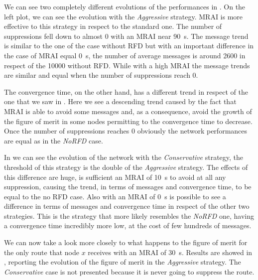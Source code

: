 We can see two completely different evolutions of the performances in .
On the left plot, we can see the evolution with the \textit{Aggressive} strategy.
\ac{MRAI} is more effective to this strategy in respect to the standard one.
The number of suppressions fell down to almost \num{0} with an \ac{MRAI} near
\SI{90}{\second}.
The message trend is similar to the one of the case without \ac{RFD} but with an
important difference in the case of  \ac{MRAI} equal \SI{0}{\second}, the number
of average messages is around \num{2600} in respect of the \num{10000} without
\ac{RFD}.
While with a high \ac{MRAI} the message trends are similar and equal when the number of
suppressions reach \num{0}.

The convergence time, on the other hand, has a different trend in respect of
the one that we saw in .
Here we see a descending trend caused by the fact that \ac{MRAI} is able to avoid
some messages and, as a consequence, avoid the growth of the figure of merit in
some nodes permitting to the convergence time to decrease.
Once the number of suppressions reaches \num{0} obviously the network performances
are equal as in the \textit{NoRFD} case.

In  we can see the evolution of the network with the
\textit{Conservative} strategy, the threshold of this strategy is the double of
the \textit{Aggressive} strategy.
The effects of this difference are huge, is sufficient an \ac{MRAI} of \SI{10}{\second}
to avoid at all any suppression, causing the trend, in terms of messages and
convergence time, to be equal to the no \ac{RFD} case.
Also with an \ac{MRAI} of \SI{0}{\second} is possible to see a difference in
terms of messages and convergence time in respect of the other two strategies.
This is the strategy that more likely resembles the \textit{NoRFD} one,
having a convergence time incredibly more low, at the cost of few hundreds of messages.

We can now take a look more closely to what happens to the figure of merit
for the only route that node $x$ receives with an \ac{MRAI} of \SI{30}{\second}.
Results are showed in , reporting
the evolution of the figure of merit in the \textit{Aggressive} strategy.
The \textit{Conservative} case is not presented because it is never going to suppress
the route.


